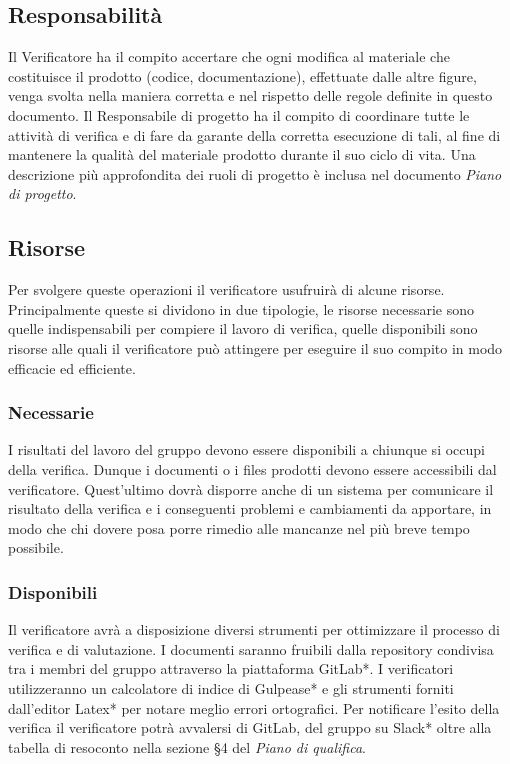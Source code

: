 \subsection{Responsabilità}
Il Verificatore ha il compito accertare che ogni modifica al materiale che costituisce il prodotto (codice, documentazione), effettuate dalle altre figure, venga svolta nella maniera corretta e nel rispetto delle regole definite in questo documento. Il Responsabile di progetto ha il compito di coordinare tutte le attività di verifica e di fare da garante della corretta esecuzione di tali, al fine di mantenere la qualità del materiale prodotto durante il suo ciclo di vita. Una descrizione più approfondita dei ruoli di progetto è inclusa nel documento  \textit{Piano di progetto}.

\subsection{Risorse}
Per svolgere queste operazioni il verificatore usufruirà di alcune risorse. Principalmente queste si dividono in due tipologie, le risorse necessarie sono quelle indispensabili per compiere il lavoro di verifica, quelle disponibili sono risorse alle quali il verificatore può attingere per eseguire il suo compito in modo efficacie ed efficiente.

\subsubsection{Necessarie}
I risultati del lavoro del gruppo devono essere disponibili a chiunque si occupi della verifica. Dunque i documenti o i files prodotti devono essere accessibili dal verificatore. Quest'ultimo dovrà disporre anche di un sistema per comunicare il risultato della verifica e i conseguenti problemi e cambiamenti da apportare, in modo che chi dovere posa porre rimedio alle mancanze nel più breve tempo possibile.

\subsubsection{Disponibili}
Il verificatore avrà a disposizione diversi strumenti per ottimizzare il processo di verifica e di valutazione. I documenti saranno fruibili dalla repository condivisa tra i membri del gruppo attraverso la piattaforma GitLab*. I verificatori utilizzeranno un calcolatore di indice di Gulpease* e gli strumenti forniti dall'editor Latex* per notare meglio errori ortografici. Per notificare l'esito della verifica il verificatore potrà avvalersi di GitLab, del gruppo su Slack* oltre alla tabella di resoconto nella sezione §4 del \textit{Piano di qualifica}.

